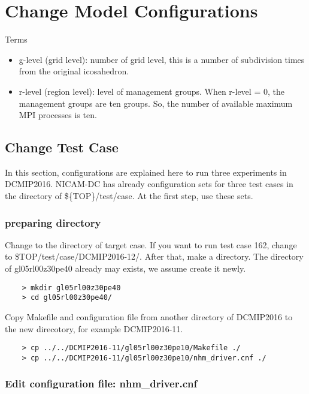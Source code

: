 \documentclass[a4paper]{article}
\begin{document}
\section{Change Model Configurations}
 {\sf Terms}
 \begin{itemize}
   \item g-level (grid level): number of grid level, this is a number of
         subdivision times from the original icosahedron.
   \item r-level (region level): level of management groups. When r-level = 0,
         the management groups are ten groups. So, the number of
         available maximum MPI processes is ten.
 \end{itemize}



\subsection{Change Test Case}
 \noindent In this section, configurations are explained here to run
 three experiments in DCMIP2016. NICAM-DC has already configuration sets
 for three test cases in the directory of \$\{TOP\}/test/case.
 At the first step, use these sets.

\subsubsection{preparing directory}
 Change to the directory of target case. If you want to run test case 162,
 change to \${TOP}/test/case/DCMIP2016-12/. After that, make a directory.
 The directory of gl05rl00z30pe40 already may exists, we assume create it newly.
 \begin{verbatim}
    > mkdir gl05rl00z30pe40
    > cd gl05rl00z30pe40/
 \end{verbatim}

 \noindent Copy Makefile and configuration file from another directory
 of DCMIP2016 to the new direcotory, for example DCMIP2016-11.
 \begin{verbatim}
    > cp ../../DCMIP2016-11/gl05rl00z30pe10/Makefile ./
    > cp ../../DCMIP2016-11/gl05rl00z30pe10/nhm_driver.cnf ./
 \end{verbatim}

\subsubsection{Edit configuration file: nhm\_driver.cnf}
\end{document}
